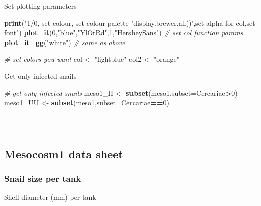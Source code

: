 \documentclass[10,portrait]{article}
\newenvironment{Shaded}{\begin{snugshade}}{\end{snugshade}}
\newcommand{\KeywordTok}[1]{\textcolor[rgb]{0.13,0.29,0.53}{\textbf{#1}}}
\newcommand{\DataTypeTok}[1]{\textcolor[rgb]{0.13,0.29,0.53}{#1}}
\newcommand{\DecValTok}[1]{\textcolor[rgb]{0.00,0.00,0.81}{#1}}
\newcommand{\StringTok}[1]{\textcolor[rgb]{0.31,0.60,0.02}{#1}}
\newcommand{\CommentTok}[1]{\textcolor[rgb]{0.56,0.35,0.01}{\textit{#1}}}
\newcommand{\OperatorTok}[1]{\textcolor[rgb]{0.81,0.36,0.00}{\textbf{#1}}}
\newcommand{\NormalTok}[1]{#1}
\begin{document}
Set plotting parameters

\begin{Shaded}
\begin{Highlighting}[]
\KeywordTok{print}\NormalTok{(}\StringTok{"1/0, set colour, set colour palette 'display.brewer.all()',set alpha for col,set font"}\NormalTok{)}
\KeywordTok{plot_it}\NormalTok{(}\DecValTok{0}\NormalTok{,}\StringTok{"blue"}\NormalTok{,}\StringTok{"YlOrRd"}\NormalTok{,}\DecValTok{1}\NormalTok{,}\StringTok{"HersheySans"}\NormalTok{) }\CommentTok{# set col function params}
\KeywordTok{plot_it_gg}\NormalTok{(}\StringTok{"white"}\NormalTok{) }\CommentTok{# same as above}

\CommentTok{# set colors you want}
\NormalTok{col <-}\StringTok{ "lightblue"} 
\NormalTok{col2 <-}\StringTok{ "orange"} 
\end{Highlighting}
\end{Shaded}

Get only infected snails

\begin{Shaded}
\begin{Highlighting}[]
\CommentTok{# get only infected snails}
\NormalTok{meso1_II <-}\StringTok{ }\KeywordTok{subset}\NormalTok{(meso1,}\DataTypeTok{subset=}\NormalTok{Cercariae}\OperatorTok{>}\DecValTok{0}\NormalTok{)}
\NormalTok{meso1_UU <-}\StringTok{ }\KeywordTok{subset}\NormalTok{(meso1,}\DataTypeTok{subset=}\NormalTok{Cercariae}\OperatorTok{==}\DecValTok{0}\NormalTok{)}
\end{Highlighting}
\end{Shaded}

\begin{center}\rule{0.5\linewidth}{\linethickness}\end{center}

~

\subsection{Mesocosm1 data sheet}\label{mesocosm1-data-sheet}

\subsubsection{Snail size per tank}\label{snail-size-per-tank}

Shell diameter (mm) per tank
\end{document}
